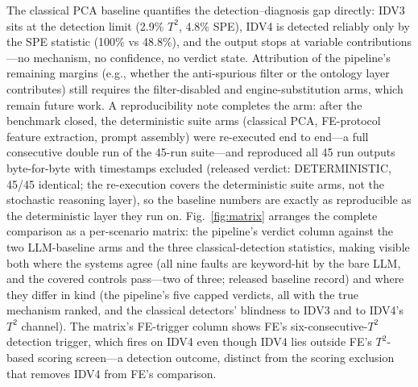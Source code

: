 \documentclass[preprint,10pt]{elsarticle}
\begin{document}
The classical PCA baseline quantifies the detection--diagnosis gap directly: IDV3 sits at the detection limit (2.9\% $T^2$, 4.8\% SPE), IDV4 is detected reliably only by the SPE statistic (100\% vs 48.8\%), and the output stops at variable contributions---no mechanism, no confidence, no verdict state. Attribution of the pipeline's remaining margins (e.g., whether the anti-spurious filter or the ontology layer contributes) still requires the filter-disabled and engine-substitution arms, which remain future work. A reproducibility note completes the arm: after the benchmark closed, the deterministic suite arms (classical PCA, FE-protocol feature extraction, prompt assembly) were re-executed end to end---a full consecutive double run of the 45-run suite---and reproduced all 45 run outputs byte-for-byte with timestamps excluded (released verdict: DETERMINISTIC, 45/45 identical; the re-execution covers the deterministic suite arms, not the stochastic reasoning layer), so the baseline numbers are exactly as reproducible as the deterministic layer they run on. Fig.~\ref{fig:matrix} arranges the complete comparison as a per-scenario matrix: the pipeline's verdict column against the two LLM-baseline arms and the three classical-detection statistics, making visible both where the systems agree (all nine faults are keyword-hit by the bare LLM, and the covered controls pass---two of three; released baseline record) and where they differ in kind (the pipeline's five capped verdicts, all with the true mechanism ranked, and the classical detectors' blindness to IDV3 and to IDV4's $T^2$ channel). The matrix's FE-trigger column shows FE's six-consecutive-$T^2$ detection trigger, which fires on IDV4 even though IDV4 lies outside FE's $T^2$-based scoring screen---a detection outcome, distinct from the scoring exclusion that removes IDV4 from FE's comparison.
\end{document}
